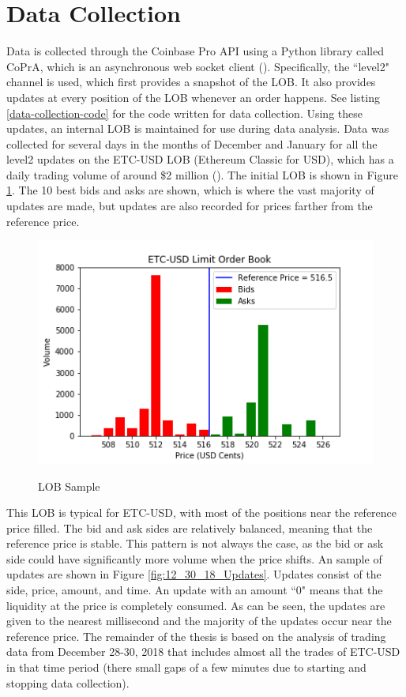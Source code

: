 \section{Data Collection}
Data is collected through the Coinbase Pro API using a Python library called CoPrA, which is an asynchronous web socket client (\cite{L3}). Specifically, the ``level2" channel is used, which first provides a snapshot of the LOB. It also provides updates at every position of the LOB whenever an order happens. See listing \ref{data-collection-code} for the code written for data collection. Using these updates, an internal LOB is maintained for use during data analysis. Data was collected for several days in the months of December and January for all the level2 updates on the ETC-USD LOB (Ethereum Classic for USD), which has a daily trading volume of around \$2 million (\cite{L1}). The initial LOB is shown in Figure \ref{fig:12_30_18_LOB_pic}. The 10 best bids and asks are shown, which is where the vast majority of updates are made, but updates are also recorded for prices farther from the reference price.

\begin{figure}[t]
\begin{center}
\caption{LOB Sample}
\includegraphics[width=\textwidth]{Figures/12_30_18_LOB.png}
\label{fig:12_30_18_LOB_pic}
\end{center}
\end{figure}

This LOB is typical for ETC-USD, with most of the positions near the reference price filled. The bid and ask sides are relatively balanced, meaning that the reference price is stable. This pattern is not always the case, as the bid or ask side could have significantly more volume when the price shifts. An sample of updates are shown in Figure \ref{fig:12_30_18_Updates}. Updates consist of the side, price, amount, and time. An update with an amount ``0" means that the liquidity at the price is completely consumed. As can be seen, the updates are given to the nearest millisecond and the majority of the updates occur near the reference price. The remainder of the thesis is based on the analysis of trading data from December 28-30, 2018 that includes almost all the trades of ETC-USD in that time period (there small gaps of a few minutes due to starting and stopping data collection).

